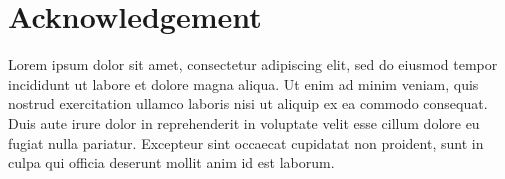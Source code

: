 
\chapter*{Acknowledgement}

Lorem ipsum dolor sit amet, consectetur adipiscing elit, sed do eiusmod tempor incididunt ut labore et dolore magna aliqua. Ut enim ad minim veniam, quis nostrud exercitation ullamco laboris nisi ut aliquip ex ea commodo consequat. Duis aute irure dolor in reprehenderit in voluptate velit esse cillum dolore eu fugiat nulla pariatur. Excepteur sint occaecat cupidatat non proident, sunt in culpa qui officia deserunt mollit anim id est laborum.

